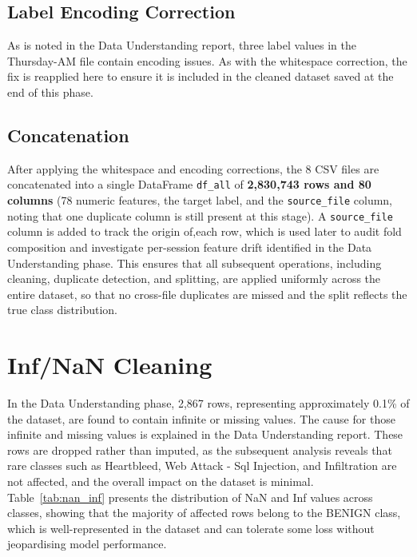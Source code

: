 \documentclass[12pt,a4paper]{article}
\begin{document}
\subsection{Label Encoding Correction}
As is noted in the Data Understanding report, three label values in the Thursday-AM file contain encoding issues. As with the whitespace correction, the fix is reapplied here to ensure it is included in the cleaned dataset saved at the end of this phase.

\subsection{Concatenation}
After applying the whitespace and encoding corrections, the 8 CSV files are concatenated into a single DataFrame \texttt{df\_all} of \textbf{2,830,743 rows and 80 columns} (78 numeric features, the target label, and the \texttt{source\_file} column, noting that one duplicate column is still present at this stage). A \texttt{source\_file} column is added to track the origin of,each row, which is used later to audit fold composition and investigate per-session feature drift identified in the Data Understanding phase. This ensures that all subsequent operations, including cleaning, duplicate detection, and splitting, are applied uniformly across the entire dataset, so that no cross-file duplicates are missed and the split reflects the true class distribution.

\section{Inf/NaN Cleaning}
In the Data Understanding phase, 2,867 rows, representing approximately 0.1\% of
the dataset, are found to contain infinite or missing values. The cause for those infinite and missing values is explained in the Data Understanding report. These rows are dropped rather than imputed, as the subsequent analysis reveals that rare classes such as Heartbleed, Web Attack - Sql Injection, and Infiltration are not affected, and the overall impact on the dataset is minimal. Table~\ref{tab:nan_inf} presents the distribution of NaN and Inf values across classes, showing that the majority of affected rows belong to the BENIGN class, which is well-represented in the dataset and can tolerate some loss without jeopardising model performance.
\end{document}
